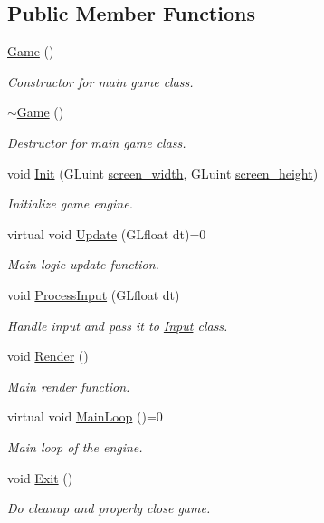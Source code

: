 \subsection*{Public Member Functions}
\begin{DoxyCompactItemize}
\item 
\mbox{\hyperlink{class_game_ad59df6562a58a614fda24622d3715b65}{Game}} ()
\begin{DoxyCompactList}\small\item\em Constructor for main game class. \end{DoxyCompactList}\item 
\mbox{\hyperlink{class_game_ae3d112ca6e0e55150d2fdbc704474530}{$\sim$\+Game}} ()
\begin{DoxyCompactList}\small\item\em Destructor for main game class. \end{DoxyCompactList}\item 
void \mbox{\hyperlink{class_game_a8f6f29e6c7f2e33801a942ebd227cf37}{Init}} (G\+Luint \mbox{\hyperlink{class_game_ac05df6adfb712932bac2afea1fb01dc3}{screen\+\_\+width}}, G\+Luint \mbox{\hyperlink{class_game_ab52e2343e6335e426a6395c44f4dab71}{screen\+\_\+height}})
\begin{DoxyCompactList}\small\item\em Initialize game engine. \end{DoxyCompactList}\item 
virtual void \mbox{\hyperlink{class_game_a4b30da80605844abc5fb07e732b85b39}{Update}} (G\+Lfloat dt)=0
\begin{DoxyCompactList}\small\item\em Main logic update function. \end{DoxyCompactList}\item 
void \mbox{\hyperlink{class_game_a25e7b07142487f0f6772809f3732a0ec}{Process\+Input}} (G\+Lfloat dt)
\begin{DoxyCompactList}\small\item\em Handle input and pass it to \mbox{\hyperlink{class_input}{Input}} class. \end{DoxyCompactList}\item 
void \mbox{\hyperlink{class_game_a0897730fc9fed789f6c0f11d21a0c14a}{Render}} ()
\begin{DoxyCompactList}\small\item\em Main render function. \end{DoxyCompactList}\item 
virtual void \mbox{\hyperlink{class_game_a385a99545d3ddbce7893807939da63da}{Main\+Loop}} ()=0
\begin{DoxyCompactList}\small\item\em Main loop of the engine. \end{DoxyCompactList}\item 
void \mbox{\hyperlink{class_game_ad06e374518f2c8fa38279be6712a6ea4}{Exit}} ()
\begin{DoxyCompactList}\small\item\em Do cleanup and properly close game. \end{DoxyCompactList}\end{DoxyCompactItemize}
